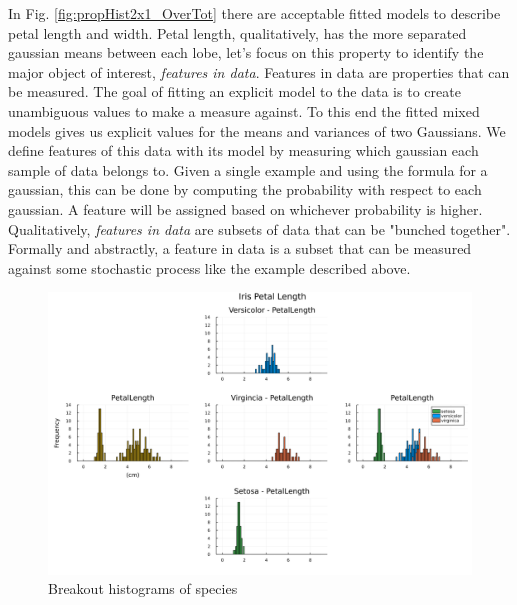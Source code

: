 In Fig. \ref{fig:propHist2x1_OverTot} there are acceptable fitted models to describe petal length and width. Petal length, qualitatively, has the more separated gaussian means between each lobe, let's focus on this property to identify the major object of interest, \emph{features in data}. Features in data are properties that can be measured. The goal of fitting an explicit model to the data is to create unambiguous values to make a measure against. To this end the fitted mixed models gives us explicit values for the means and variances of two Gaussians. We define features of this data with its model by measuring which gaussian each sample of data belongs to. Given a single example and using the formula for a gaussian, this can be done by computing the probability with respect to each gaussian. A feature will be assigned based on whichever probability is higher. Qualitatively, \emph{features in data} are subsets of data that can be "bunched together". Formally and abstractly, a feature in data is a subset that can be measured against some stochastic process like the example described above.

\begin{figure}[h]
\centering
    \includegraphics[width=1.0\textwidth]{Code/histBreakoutPetalLength.png}
    \caption{Breakout histograms of species }
    \label{fig:specBreakout}
\end{figure}

